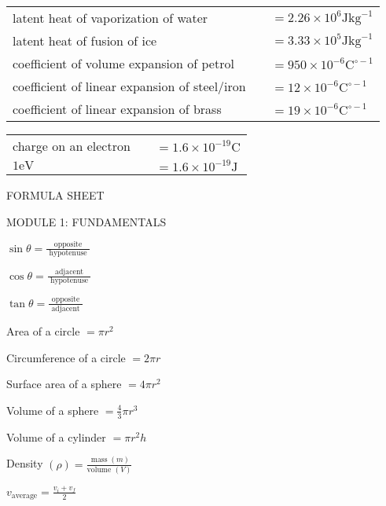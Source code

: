 \documentclass{extarticle}
\begin{document}
\begin{tabularx}{\textwidth}{@{}X@{}r@{}l@{}}

latent heat of vaporization of water & & $=2.26 \times 10^{6} \mathrm{J} \mathrm{kg}^{-1}$ \\
latent heat of fusion of ice & & $=3.33 \times 10^{5} \mathrm{J} \mathrm{kg}^{-1}$ \\
coefficient of volume expansion of petrol & & $=950 \times 10^{-6} \mathrm{C}^{\circ-1}$ \\
coefficient of linear expansion of steel/iron & & $=12 \times 10^{-6} \mathrm{C}^{\circ-1}$ \\
coefficient of linear expansion of brass & & $=19 \times 10^{-6} \mathrm{C}^{\circ-1}$ \\

\end{tabularx}

\begin{tabularx}{\textwidth}{@{}X@{}r@{}l@{}}

charge on an electron & & $=1.6 \times 10^{-19} \mathrm{C}$ \\
$1 \mathrm{eV}$ & & $=1.6 \times 10^{-19} \mathrm{J}$ \\

\end{tabularx}


\markEnd



FORMULA SHEET

MODULE 1: FUNDAMENTALS
\markStart[25]

$\sin \theta=\frac{\text { opposite }}{\text { hypotenuse }}$

$\cos \theta=\frac{\text { adjacent }}{\text { hypotenuse }}$

$\tan \theta=\frac{\text { opposite }}{\text { adjacent }}$

\markEnd

\markStart[100]


Area of a circle $=\pi r^{2}$

Circumference of a circle $=2 \pi r$

Surface area of a sphere $=4 \pi r^{2} \quad$

Volume of a sphere $=\frac{4}{3} \pi r^{3}$

Volume of a cylinder $=\pi r^{2} h \quad$

Density $(\rho)=\frac{\operatorname{mass}(m)}{\text {volume }(V)}$

$v_{\text {average}}=\frac{v_{i}+v_{f}}{2}$
\end{document}
